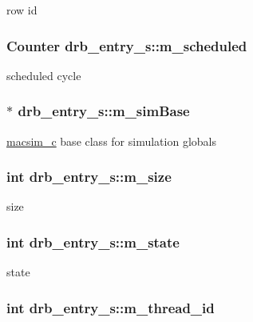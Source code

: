 \label{structdrb__entry__s_ae2b908fe6d45df4e87ff9311cb3a7cb3}
row id \hypertarget{structdrb__entry__s_a967c6ecd056b73b1775bf150d9bef358}{
\subsubsection[{m\_\-scheduled}]{\setlength{\rightskip}{0pt plus 5cm}Counter {\bf drb\_\-entry\_\-s::m\_\-scheduled}}}
\label{structdrb__entry__s_a967c6ecd056b73b1775bf150d9bef358}
scheduled cycle \hypertarget{structdrb__entry__s_acf3a8b744c9a0e9e6913668c857708c3}{
\subsubsection[{m\_\-simBase}]{$\ast$ {\bf drb\_\-entry\_\-s::m\_\-simBase}}}
\label{structdrb__entry__s_acf3a8b744c9a0e9e6913668c857708c3}
\hyperlink{classmacsim__c}{macsim\_\-c} base class for simulation globals \hypertarget{structdrb__entry__s_a9c9e5421e638131d5cb0873b54132254}{
\subsubsection[{m\_\-size}]{\setlength{\rightskip}{0pt plus 5cm}int {\bf drb\_\-entry\_\-s::m\_\-size}}}
\label{structdrb__entry__s_a9c9e5421e638131d5cb0873b54132254}
size \hypertarget{structdrb__entry__s_ae4be988b683e61a224097314c628fd2f}{
\subsubsection[{m\_\-state}]{\setlength{\rightskip}{0pt plus 5cm}int {\bf drb\_\-entry\_\-s::m\_\-state}}}
\label{structdrb__entry__s_ae4be988b683e61a224097314c628fd2f}
state \hypertarget{structdrb__entry__s_a9c4047d6412445c6d01df388fef1a761}{
\subsubsection[{m\_\-thread\_\-id}]{\setlength{\rightskip}{0pt plus 5cm}int {\bf drb\_\-entry\_\-s::m\_\-thread\_\-id}}}
